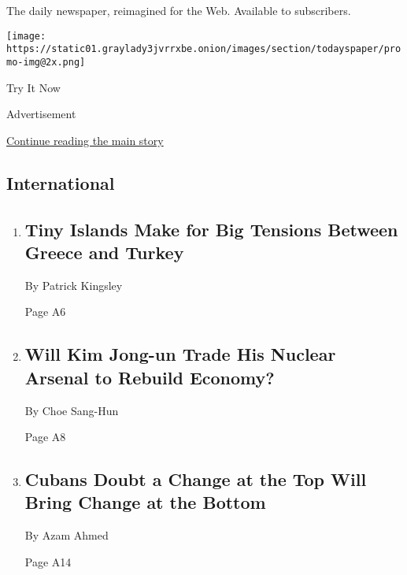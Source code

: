 The daily newspaper, reimagined for the Web. Available to subscribers.

\texttt{[image: https://static01.graylady3jvrrxbe.onion/images/section/todayspaper/promo-img@2x.png]}

Try It Now

Advertisement

\protect\hyperlink{after-mid1}{Continue reading the main story}

\hypertarget{international}{%
\subsection{International}\label{international}}

\begin{enumerate}
\def\labelenumi{\arabic{enumi}.}
\item
  \href{/2018/04/21/world/europe/greece-turkey-islands.html}{}

  \hypertarget{tiny-islands-make-for-big-tensions-between-greece-and-turkey-1}{%
  \subsection{Tiny Islands Make for Big Tensions Between Greece and
  Turkey}\label{tiny-islands-make-for-big-tensions-between-greece-and-turkey-1}}

  By Patrick Kingsley

  Page A6
\item
  \href{/2018/04/21/world/asia/north-korea-kim-jong-un-nuclear-tests.html}{}

  \hypertarget{will-kim-jong-un-trade-his-nuclear-arsenal-to-rebuild-economy-1}{%
  \subsection{Will Kim Jong-un Trade His Nuclear Arsenal to Rebuild
  Economy?}\label{will-kim-jong-un-trade-his-nuclear-arsenal-to-rebuild-economy-1}}

  By Choe Sang-Hun

  Page A8
\item
  \href{/2018/04/21/world/cuba-castro-diaz-canel.html}{}

  \hypertarget{cubans-doubt-a-change-at-the-top-will-bring-change-at-the-bottom}{%
  \subsection{Cubans Doubt a Change at the Top Will Bring Change at the
  Bottom}\label{cubans-doubt-a-change-at-the-top-will-bring-change-at-the-bottom}}

  By Azam Ahmed

  Page A14
\end{enumerate}

